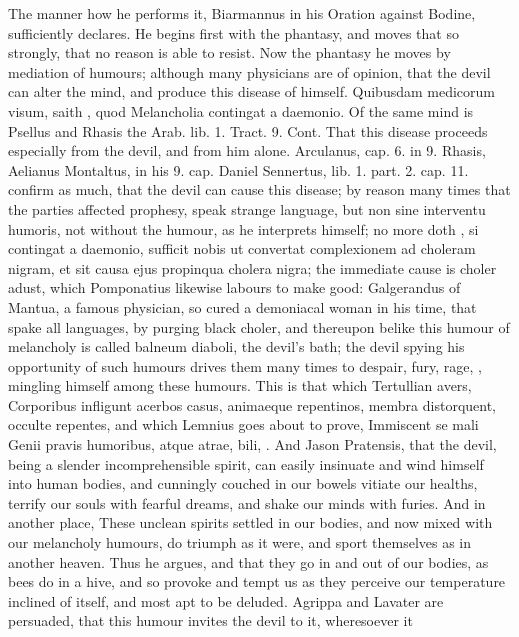 {{The manner how he performs it, Biarmannus in his Oration against
Bodine, sufficiently declares. He begins first with the phantasy,
and moves that so strongly, that no reason is able to resist. Now the
phantasy he moves by mediation of humours; although many physicians are
of opinion, that the devil can alter the mind, and produce this disease
of himself. Quibusdam medicorum visum, saith \Avicenna{}, quod
Melancholia contingat a daemonio. Of the same mind is Psellus and
Rhasis the Arab. lib. 1. Tract. 9. Cont. That this disease
proceeds especially from the devil, and from him alone. Arculanus, cap.
6. in 9. Rhasis, Aelianus Montaltus, in his 9. cap. Daniel Sennertus,
lib. 1. part. 2. cap. 11. confirm as much, that the devil can cause
this disease; by reason many times that the parties affected prophesy,
speak strange language, but non sine interventu humoris, not without
the humour, as he interprets himself; no more doth \Avicenna{}, si
contingat a daemonio, sufficit nobis ut convertat complexionem ad
choleram nigram, et sit causa ejus propinqua cholera nigra; the
immediate cause is choler adust, which  Pomponatius likewise
labours to make good: Galgerandus of Mantua, a famous physician, so
cured a demoniacal woman in his time, that spake all languages, by
purging black choler, and thereupon belike this humour of melancholy is
called balneum diaboli, the devil's bath; the devil spying his
opportunity of such humours drives them many times to despair, fury,
rage, \etc{}, mingling himself among these humours. This is that which
Tertullian avers, Corporibus infligunt acerbos casus, animaeque
repentinos, membra distorquent, occulte repentes, \etc{} and which Lemnius
goes about to prove, Immiscent se mali Genii pravis humoribus, atque
atrae, bili, \etc{}. And Jason Pratensis, that the devil, being a
slender incomprehensible spirit, can easily insinuate and wind himself
into human bodies, and cunningly couched in our bowels vitiate our
healths, terrify our souls with fearful dreams, and shake our minds
with furies. And in another place, These unclean spirits settled in our
bodies, and now mixed with our melancholy humours, do triumph as it
were, and sport themselves as in another heaven. Thus he argues, and
that they go in and out of our bodies, as bees do in a hive, and so
provoke and tempt us as they perceive our temperature inclined of
itself, and most apt to be deluded.  Agrippa and Lavater
are persuaded, that this humour invites the devil to it, wheresoever it
}}

